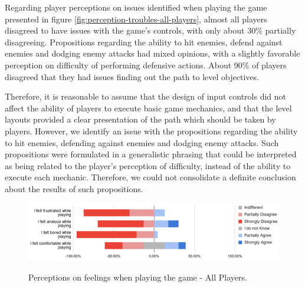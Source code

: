 Regarding player perceptions on issues identified when playing the game presented in figure \ref{fig:perception-troubles-all-players}, almost all players disagreed to have issues with the game's controls, with only about 30\% partially disagreeing. Propositions regarding the ability to hit enemies, defend against enemies and dodging enemy attacks had mixed opinions, with a slightly favorable perception on difficulty of performing defensive actions. About 90\% of players disagreed that they had issues finding out the path to level objectives.

Therefore, it is reasonable to assume that the design of input controls did not affect the ability of players to execute basic game mechanics, and that the level layouts provided a clear presentation of the path which should be taken by players. However, we identify an issue with the propositions regarding the ability to hit enemies, defending against enemies and dodging enemy attacks. Such propositions were formulated in a generalistic phrasing that could be interpreted as being related to the player's perception of difficulty, instead of the ability to execute each mechanic. Therefore, we could not consolidate a definite conclusion about the results of such propositions.

\begin{figure}[!ht]
    \begin{center}
    \caption{Perceptions on feelings when playing the game - All Players.}
        \includegraphics[width=36em]{figures/fig-perception-feelings-all-players.png}
        \label{fig:perception-feelings-all-players}
    \end{center}
\end{figure}

